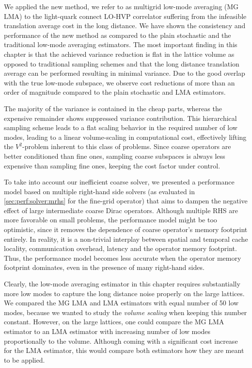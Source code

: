 We applied the new method, we refer to as multigrid low-mode averaging (MG LMA) to the light-quark connect LO-HVP correlator suffering from the infeasible translation average cost in the long distance.
We have shown the consistency and performance of the new method as compared to the plain stochastic and the traditional low-mode averaging estimators.
The most important finding in this chapter is that the achieved variance reduction is flat in the lattice volume as opposed to traditional sampling schemes and that the long distance translation average can be performed resulting in minimal variance.
Due to the good overlap with the true low-mode subspace, we observe cost reductions of more than an order of magnitude compared to the plain stochastic and LMA estimators.

The majority of the variance is contained in the cheap parts, whereas the expensive remainder shows suppressed variance contribution.
This hierarchical sampling scheme leads to a flat scaling behavior in the required number of low modes, leading to a linear volume-scaling in computational cost, effectively lifting the $V^{2}$-problem inherent to this class of problems.
Since coarse operators are better conditioned than fine ones, sampling coarse subspaces is always less expensive than sampling fine ones, keeping the cost factor under control.

To take into account our inefficient coarse solver, we presented a performance model based on multiple right-hand side solvers (as evaluated in \cref{sec:perf:solver:mrhs} for the fine-grid operator) that aims to dampen the negative effect of large intermediate coarse Dirac operators.
Although multiple RHS are more favorable on small problems, the performance model might be too optimistic, since it removes the dependence of coarse operator's memory footprint entirely.
In reality, it is a non-trivial interplay between spatial and temporal cache locality, communication overhead, latency and the operator memory footprint.
Thus, the performance model becomes less accurate when the operator memory footprint dominates, even in the presence of many right-hand sides.

Clearly, the low-mode averaging estimator in this chapter requires substantially more low modes to capture the long distance noise properly on the large lattices.
We compared the MG LMA and LMA estimators with equal number of \num{50} low modes, because we wanted to study the \emph{volume scaling} when keeping this number constant.
However, on the large lattices, one could compare the MG LMA estimator to an LMA estimator with increasing number of low modes proportionally to the volume.
Although coming with a significant cost increase for the LMA estimator, this would compare both estimators how they are meant to be applied.

